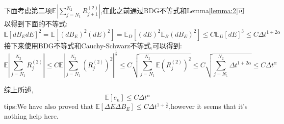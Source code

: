 \documentclass[12pt,final]{article}
\makeatletter
\numberwithin{equation}{section}
\numberwithin{figure}{section}
\numberwithin{table}{section}
\theoremstyle{plain}
\renewcommand{\proofname}{proof}
\theoremstyle{definition}
\theoremstyle{remark}
\renewenvironment{proof}[1][\proofname]{\par
	\pushQED{\qed}%
	\normalfont \topsep6\p@\@plus6\p@\relax
	\trivlist\item[\hskip\labelsep
	\bfseries #1\@addpunct{\,:\,}]\ignorespaces
}{%
	\popQED\endtrivlist\@endpefalse
}
\makeatother
\begin{document}
\begin{proof}
		下面考虑第二项$\mathbb{E}|\sum\limits_{j=N_1}^{N_2}R_{j+1}^{(2)}|$,在此之前通过BDG不等式和Lemma\ref{lemma:2}可以得到下面的不等式:
		\begin{equation}
			\mathbb{E}[dB_EdE]^2=\mathbb{E}[(dB_E)^2(dE)^2]=\mathbb{E}_D[(dE)^2\mathbb{E}_B(dB_E)^2]\leq
			C\mathbb{E}_{D}[dE]^3\leq C\Delta t ^{1+2\alpha}
		\end{equation}
		接下来使用BDG不等式和Cauchy-Schwarz不等式,可以得到:
		\begin{equation*}
			\mathbb{E}\left|\sum_{j=N_1}^{N_2}R_{j}^{(2)}\right|  \le C\mathbb{E} \left|\sum_{j=N_1}^{N_2}(R_{j}^{(2)})^2\right|^{\frac{1}{2}} \le C\sqrt{\sum_{j=N_1}^{N_2}\mathbb{E}(R_{j}^{(2)})^2}
			\le C\sqrt{\sum_{j=N_1}^{N_2}\Delta t^{1+2\alpha}} \le C\Delta t^{\alpha}
		\end{equation*}
		
		
		综上所述,
		\begin{equation*}
			\mathbb{E} [e_n] \leq C\Delta t^\alpha
		\end{equation*}
	\end{proof}
	tips:We have also proved that $\mathbb{E} [\Delta E \Delta B_E ] \le C\Delta t ^{1+\frac{\alpha}{2}}$,however it seems that it's nothing help here.
\end{document}

